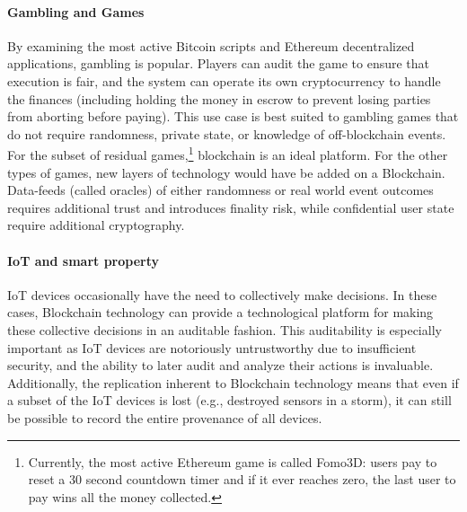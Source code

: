 \paragraph{Gambling and Games}
By examining the most active Bitcoin scripts and Ethereum decentralized applications, gambling is popular. Players can audit the game to ensure that execution is fair, and the system can operate its own cryptocurrency to handle the finances (including holding the money in escrow to prevent losing parties from aborting before paying). This use case is best suited to gambling games that do not require randomness, private state, or knowledge of off-blockchain events. For the subset of residual games,\footnote{Currently, the most active Ethereum game is called Fomo3D: users pay to reset a 30 second countdown timer and if it ever reaches zero, the last user to pay wins all the money collected.} blockchain is an ideal platform. For the other types of games, new layers of technology would have be added on a Blockchain. Data-feeds (called oracles) of either randomness or real world event outcomes requires additional trust and introduces finality risk, while confidential user state require additional cryptography.  

\paragraph{IoT and smart property}
IoT devices occasionally have the need to collectively make decisions.
In these cases, Blockchain technology can provide a technological platform for making these collective decisions in an auditable fashion.
This auditability is especially important as IoT devices are notoriously untrustworthy due to insufficient security, and the ability to later audit and analyze their actions is invaluable.
Additionally, the replication inherent to Blockchain technology means that even if a subset of the IoT devices is lost (e.g., destroyed sensors in a storm), it can still be possible to record the entire provenance of all devices.



